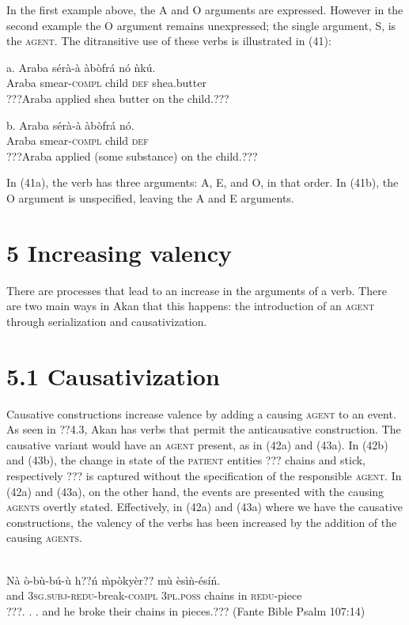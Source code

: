 \documentclass[output=paper]{langsci/langscibook}
\begin{document}
In the first example above, the A and O arguments are expressed. However in the second example the O argument remains unexpressed; the single argument, S, is the \textsc{agent}. The ditransitive use of these verbs is illustrated in (41):

\ea
\gll a.  Araba  sérà-à    àbòfrá  nó  ǹkú.\\
       Araba  smear-\textsc{compl}  child  \textsc{def}  shea.butter\\
\glt ???Araba applied shea butter on the child.???
\z

\ea
\gll  b.  Araba  sérà-à    àbòfrá  nó.\\
       Araba  smear-\textsc{compl}  child  \textsc{def}\\
\glt ???Araba applied (some substance) on the child.???
\z

In (41a), the verb has three arguments: A, E, and O, in that order. In (41b), the O argument is unspecified, leaving the A and E arguments.

\section[5  Increasing valency]{5  Increasing valency}

There are processes that lead to an increase in the arguments of a verb. There are two main ways in Akan that this happens: the introduction of an \textsc{agent} through serialization and causativization.

\section{5.1  Causativization}

Causative constructions increase valence by adding a causing \textsc{agent} to an event. As seen in ??4.3, Akan has verbs that permit the anticausative construction. The causative variant would have an \textsc{agent} present, as in (42a) and (43a). In (42b) and (43b), the change in state of the \textsc{patient} entities ??? chains and stick, respectively ??? is captured without the specification of the responsible \textsc{agent}. In (42a) and (43a), on the other hand, the events are presented with the causing \textsc{agents} overtly stated. Effectively, in (42a) and (43a) where we have the causative constructions, the valency of the verbs has been increased by the addition of the causing \textsc{agents}.


\ea\label{ex:}
\\
\gll Nà  ò-b\`{u}-bú-\`{u}      h??ń    \`{m}pòkyèr??  m\`{u}   èsìǹ-ésíń.\\
     and  \textsc{3sg.subj}{}-\textsc{redu}{}-break-\textsc{compl}  \textsc{3pl.poss}  chains    in  \textsc{redu}{}-piece\\
\glt ???. . . and he broke their chains in pieces.??? (Fante Bible Psalm 107:14)
\z
\end{document}
